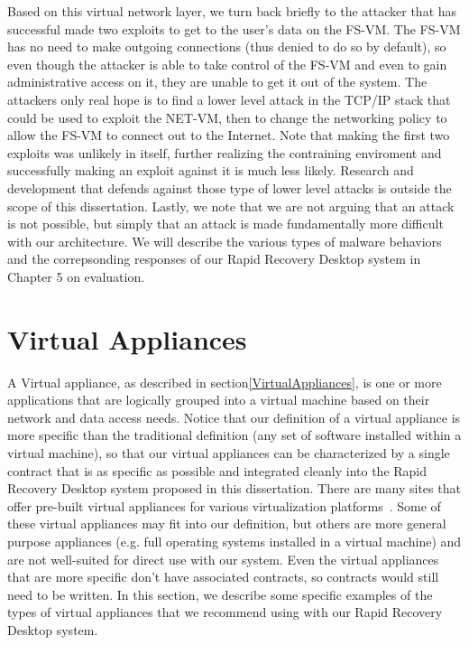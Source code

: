 Based on this virtual network layer, we turn back briefly to the attacker that has successful made two exploits to get to the user's data on the FS-VM. The FS-VM has no need to make outgoing connections (thus denied to do so by default), so even though the attacker is able to take control of the FS-VM and even to gain administrative access on it, they are unable to get it out of the system. The attackers only real hope is to find a lower level attack in the TCP/IP stack that could be used to exploit the NET-VM, then to change the networking policy to allow the FS-VM to connect out to the Internet. Note that making the first two exploits was unlikely in itself, further realizing the contraining enviroment and successfully making an exploit against it is much less likely. Research and development that defends against those type of lower level attacks is outside the scope of this dissertation. Lastly, we note that we are not arguing that an attack is not possible, but simply that an attack is made fundamentally more difficult with our architecture. We will describe the various types of malware behaviors and the correpsonding responses of our Rapid Recovery Desktop system in Chapter 5 on evaluation.

\section{Virtual Appliances}

A Virtual appliance, as described in section\ref{VirtualAppliances}, is one or more applications that are logically grouped into a virtual machine based on their network and data access needs. Notice that our definition of a virtual appliance is more specific than the traditional definition (any set of software installed within a virtual machine), so that our virtual appliances can be characterized by a single contract that is as specific as possible and integrated cleanly into the Rapid Recovery Desktop system proposed in this dissertation. There are many sites that offer pre-built virtual appliances for various virtualization platforms~\cite{vmware_appliances_website, rPath_website,  stacklet_website, virtual_appliances_website,  jumpbox_website}. Some of these virtual appliances may fit into our definition, but others are more general purpose appliances (e.g. full operating systems installed in a virtual machine) and are not well-suited for direct use with our system. Even the virtual appliances that are more specific don't have associated contracts, so contracts would still need to be written. In this section, we describe some specific examples of the types of virtual appliances that we recommend using with our Rapid Recovery Desktop system.

